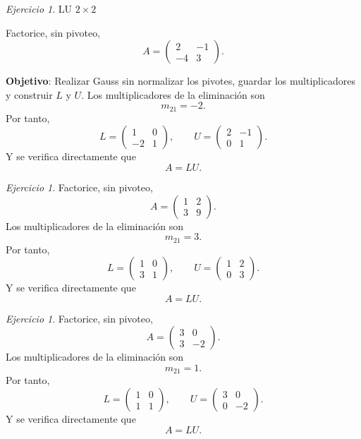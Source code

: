 \documentclass[12pt]{article}
\theoremstyle{remark}
\newtheorem{Ejer}[definicion]{Ejercicio}
\begin{document}
\begin{Ejer} LU $2\times 2$

Factorice, sin pivoteo,
\[
A=\begin{pmatrix}2 & -1\\-4 & 3\end{pmatrix}.
\]

\textbf{Objetivo}: Realizar Gauss sin normalizar los pivotes, guardar los multiplicadores y construir $L$ y $U$.
 Los multiplicadores de la eliminación son
\[
m_{21}=-2.
\]
Por tanto,
\[
L=\begin{pmatrix}1 & 0\\-2 & 1\end{pmatrix},\qquad U=\begin{pmatrix}2 & -1\\0 & 1\end{pmatrix}.
\]
Y se verifica directamente que
\[
\boxed{A=LU}.
\]
\end{Ejer}
\begin{Ejer} 

Factorice, sin pivoteo,
\[
A=\begin{pmatrix}1 & 2\\3 & 9\end{pmatrix}.
\]
 Los multiplicadores de la eliminación son
\[
m_{21}=3.
\]
Por tanto,
\[
L=\begin{pmatrix}1 & 0\\3 & 1\end{pmatrix},\qquad U=\begin{pmatrix}1 & 2\\0 & 3\end{pmatrix}.
\]
Y se verifica directamente que
\[
\boxed{A=LU}.
\]

\end{Ejer}
\begin{Ejer}
Factorice, sin pivoteo,
\[
A=\begin{pmatrix}3 & 0\\3 & -2\end{pmatrix}.
\]
 Los multiplicadores de la eliminación son
\[
m_{21}=1.
\]
Por tanto,
\[
L=\begin{pmatrix}1 & 0\\1 & 1\end{pmatrix},\qquad U=\begin{pmatrix}3 & 0\\0 & -2\end{pmatrix}.
\]
Y se verifica directamente que
\[
\boxed{A=LU}.
\]
\end{Ejer}
\end{document}
